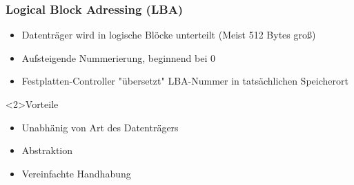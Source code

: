 \begin{frame}
    \frametitle{Logical Block Adressing (LBA)}

    \begin{itemize}
        \item Datenträger wird in logische Blöcke unterteilt (Meist 512 Bytes groß)
        \item Aufsteigende Nummerierung, beginnend bei 0
        \item Festplatten-Controller "übersetzt" LBA-Nummer in tatsächlichen Speicherort
    \end{itemize}

    \vspace{1cm}
    \begin{exampleblock}<2>{Vorteile}
        \begin{itemize}
            \item Unabhänig von Art des Datenträgers
            \item Abstraktion
            \item Vereinfachte Handhabung
        \end{itemize}
    \end{exampleblock}
\end{frame}
